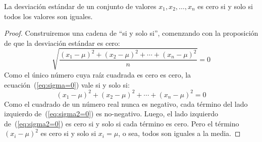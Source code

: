   \begin{proposition}
    La desviación estándar
    de un conjunto de valores \(x_1, x_2, \dotsc, x_n\)
    es cero si y solo si todos los valores son iguales.
  \end{proposition}
  \begin{proof}
    Construiremos una cadena de ``si y solo si'',
    comenzando con la proposición
    de que la desviación estándar es cero:
    \begin{equation}
      \label{eq:sigma=0}
      \sqrt{\frac{(x_1 - \mu)^2
		    + (x_2 - \mu)^2
		    + \dotsb
		    + (x_n - \mu)^2}
		 {n}}
	  = 0
    \end{equation}
    Como el único número cuya raíz cuadrada es cero es cero,
    la ecuación~(\ref{eq:sigma=0}) vale si y solo si:
    \begin{equation}
      \label{eq:sigma2=0}
      (x_1 - \mu)^2 + (x_2 - \mu)^2 + \dotsb + (x_n - \mu)^2
	  = 0
    \end{equation}
    Como el cuadrado de un número real
    nunca es negativo,
    cada término del lado izquierdo
    de~(\ref{eq:sigma2=0}) es no\nobreakdash-negativo.
    Luego,
    el lado izquierdo de~(\ref{eq:sigma2=0}) es cero si y solo si
    cada término es cero.
    Pero el término \((x_i - \mu)^2\) es cero si y solo si
    \(x_i = \mu\),
    o sea,
    todos son iguales a la media.
  \end{proof}

